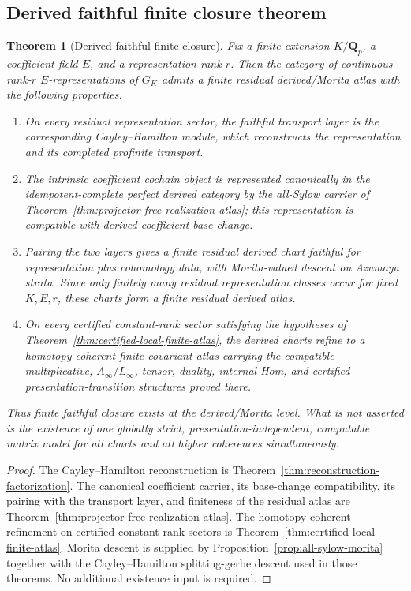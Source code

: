 \documentclass[11pt]{article}
\newtheorem{theorem}{Theorem}[section]
\theoremstyle{definition}
\newcommand{\Qp}{\mathbf Q_p}
\begin{document}
\subsection{Derived faithful finite closure theorem}

\begin{theorem}[Derived faithful finite closure]\label{thm:derived-faithful-finite-closure}
Fix a finite extension $K/\Qp$, a coefficient field $E$, and a representation rank $r$.
Then the category of continuous rank-$r$ $E$-representations of $G_K$ admits a finite residual derived/Morita atlas with the following properties.
\begin{enumerate}[label=\textnormal{(\roman*)}]
\item On every residual representation sector, the faithful transport layer is the corresponding Cayley--Hamilton module, which reconstructs the representation and its completed profinite transport.
\item The intrinsic coefficient cochain object is represented canonically in the idempotent-complete perfect derived category by the all-Sylow carrier of Theorem~\ref{thm:projector-free-realization-atlas}; this representation is compatible with derived coefficient base change.
\item Pairing the two layers gives a finite residual derived chart faithful for representation plus cohomology data, with Morita-valued descent on Azumaya strata.  Since only finitely many residual representation classes occur for fixed $K,E,r$, these charts form a finite residual derived atlas.
\item On every certified constant-rank sector satisfying the hypotheses of Theorem~\ref{thm:certified-local-finite-atlas}, the derived charts refine to a homotopy-coherent finite covariant atlas carrying the compatible multiplicative, $A_\infty/L_\infty$, tensor, duality, internal-Hom, and certified presentation-transition structures proved there.
\end{enumerate}
Thus finite faithful closure exists at the derived/Morita level.  What is not asserted is the existence of one globally strict, presentation-independent, computable matrix model for all charts and all higher coherences simultaneously.
\end{theorem}

\begin{proof}
The Cayley--Hamilton reconstruction is Theorem~\ref{thm:reconstruction-factorization}.  The canonical coefficient carrier, its base-change compatibility, its pairing with the transport layer, and finiteness of the residual atlas are Theorem~\ref{thm:projector-free-realization-atlas}.  The homotopy-coherent refinement on certified constant-rank sectors is Theorem~\ref{thm:certified-local-finite-atlas}.  Morita descent is supplied by Proposition~\ref{prop:all-sylow-morita} together with the Cayley--Hamilton splitting-gerbe descent used in those theorems.  No additional existence input is required.
\end{proof}
\end{document}
